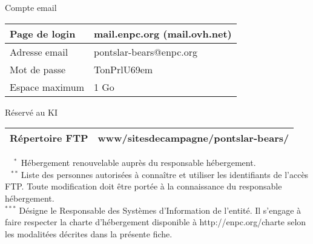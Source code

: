 \documentclass{ki019}
\newenvironment{tableau}[1]{
\LARGE #1\\
\vspace{0.4cm}
\begin{tabular}{|K{5cm}|K{10cm}|}
}
{
\end{tabular}
\vspace{0.5cm}
}
\begin{document}
\begin{center}
\begin{tableau}{Compte email}
\hline
Page de login & mail.enpc.org (mail.ovh.net) \\
\hline
Adresse email & pontslar-bears@enpc.org \\
\hline
Mot de passe & TonPrlU69em \\
\hline
Espace maximum & 1 Go \\
\hline
\end{tableau}

\begin{tableau}{Réservé au KI}
\hline
Répertoire FTP & www/sitesdecampagne/pontslar-bears/ \\
\hline
\end{tableau}

\end{center}

\vspace{-0.5cm}
\noindent
$^{\phantom{**}*}$ Hébergement renouvelable auprès du responsable hébergement. \\
$^{\phantom{*}**}$ Liste des personnes autorisées à connaître et utiliser les identifiants de l'accès FTP. Toute modification doit être portée à la connaissance du responsable hébergement. \\
$^{***}$ Désigne le Responsable des Systèmes d'Information de l'entité. Il s'engage à faire respecter la charte d'hébergement disponible à http://enpc.org/charte selon les modalitées décrites dans la présente fiche.


\Footer{\today}
\end{document}
